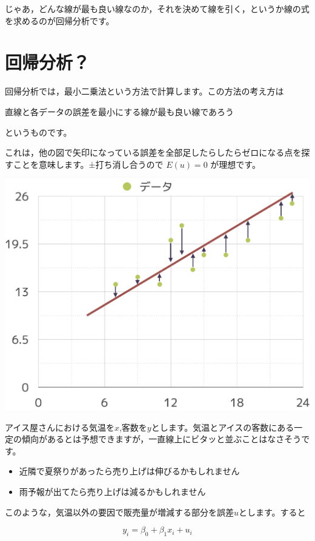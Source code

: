 \documentclass[
  letterpaper,
  DIV=11,
  numbers=noendperiod]{scrreprt}
\providecommand{\tightlist}{%
  \setlength{\itemsep}{0pt}\setlength{\parskip}{0pt}}\usepackage{longtable,booktabs,array}
\begin{document}
じゃあ，どんな線が最も良い線なのか，それを決めて線を引く，というか線の式を求めるのが回帰分析です。

\hypertarget{ux56deux5e30ux5206ux6790}{%
\chapter{回帰分析？}\label{ux56deux5e30ux5206ux6790}}

回帰分析では，最小二乗法という方法で計算します。この方法の考え方は

直線と各データの誤差を最小にする線が最も良い線であろう

というものです。

これは，他の図で矢印になっている誤差を全部足したらしたらゼロになる点を探すことを意味します。±打ち消し合うので
\(E(u)=0\) が理想です。

\includegraphics{images/Untitled 2.png}

アイス屋さんにおける気温を\(x\),客数を\(y\)とします。気温とアイスの客数にある一定の傾向があるとは予想できますが，一直線上にビタッと並ぶことはなさそうです。

\begin{itemize}
\tightlist
\item
  近隣で夏祭りがあったら売り上げは伸びるかもしれません
\item
  雨予報が出てたら売り上げは減るかもしれません
\end{itemize}

このような，気温以外の要因で販売量が増減する部分を誤差\(u\)とします。すると

\[
y_i = \beta_0 + \beta_1x_i+u_i
\]
\end{document}
